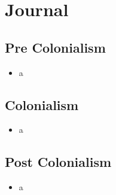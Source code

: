 \section{Journal}

\subsection{Pre Colonialism}
\begin{itemize}
    \item a
\end{itemize}

\subsection{Colonialism}
\begin{itemize}
    \item a
\end{itemize}

\subsection{Post Colonialism}
\begin{itemize}
    \item a
\end{itemize}

\newpage
